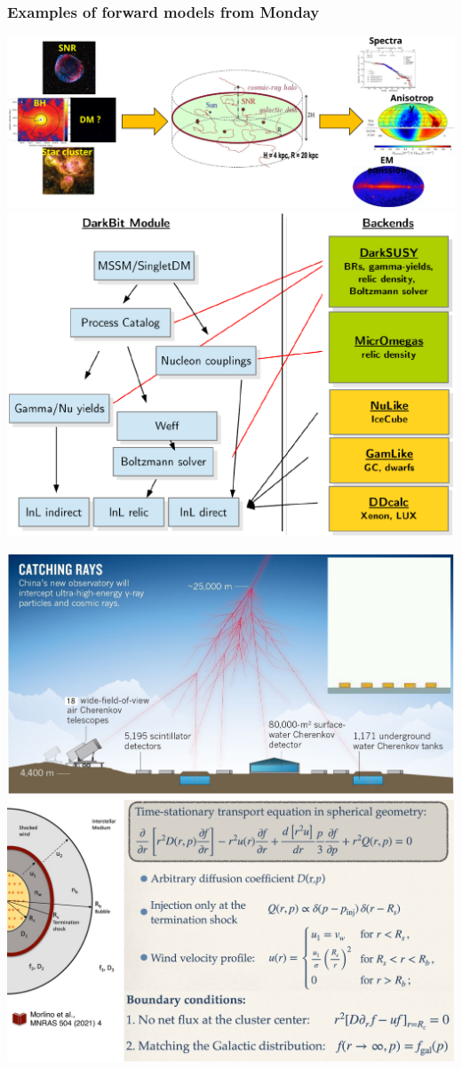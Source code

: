 \documentclass[aspectratio=169]{beamer}
\begin{document}
\begin{frame}
    \frametitle{Examples of forward models from Monday}
    \centerline{%
        \includegraphics[height=0.45\textheight]{figures/tmex-1}\hfill
        \includegraphics[height=0.45\textheight]{figures/tmex-4}
    }
    \centerline{%
        \includegraphics[height=0.45\textheight]{figures/tmex-2}\hfill
        \includegraphics[height=0.45\textheight]{figures/tmex-3}
    }
\end{frame}
\end{document}

